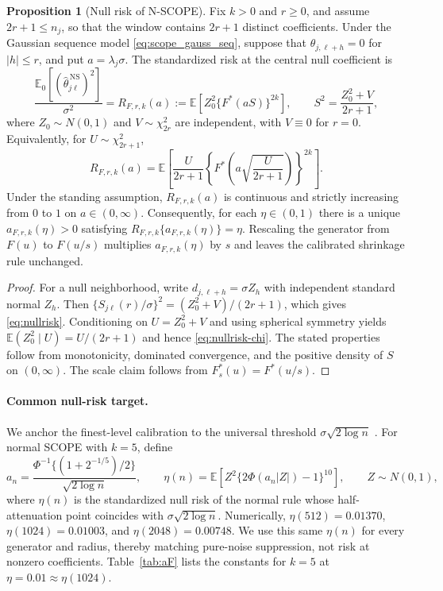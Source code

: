 \documentclass[12pt]{article}
\theoremstyle{definition}
\newtheorem{proposition}{Proposition}
\theoremstyle{definition}
\newcommand{\E}{\mathbb{E}}
\begin{document}
\begin{proposition}[Null risk of N-SCOPE]
\label{prop:nullrisk}
Fix $k>0$ and $r\geq0$, and assume $2r+1\le n_j$, so that the window
contains $2r+1$ distinct coefficients. Under the Gaussian sequence model
\eqref{eq:scope_gauss_seq}, suppose that $\theta_{j,\ell+h}=0$ for
$|h|\leq r$, and put $a=\lambda_j\sigma$. The standardized risk at the
central null coefficient is
\begin{equation}
\frac{\E_0[(\widehat\theta_{j\ell}^{\,\mathrm{NS}})^2]}{\sigma^2}
 = R_{F,r,k}(a)
 :=\E\!\left[Z_0^2\{F^*(aS)\}^{2k}\right],
 \qquad S^2=\frac{Z_0^2+V}{2r+1},
\label{eq:nullrisk}
\end{equation}
where $Z_0\sim N(0,1)$ and $V\sim\chi^2_{2r}$ are independent, with
$V\equiv0$ for $r=0$. Equivalently, for $U\sim\chi^2_{2r+1}$,
\begin{equation}
R_{F,r,k}(a)
 = \E\!\left[\frac{U}{2r+1}
 \left\{F^*\!\left(a\sqrt{\frac{U}{2r+1}}\right)\right\}^{2k}\right].
\label{eq:nullrisk-chi}
\end{equation}
Under the standing assumption, $R_{F,r,k}(a)$ is continuous and
strictly increasing from $0$ to $1$ on $a\in(0,\infty)$. Consequently,
for each $\eta\in(0,1)$ there is a unique $a_{F,r,k}(\eta)>0$
satisfying $R_{F,r,k}\{a_{F,r,k}(\eta)\}=\eta$. Rescaling the generator
from $F(u)$ to $F(u/s)$ multiplies $a_{F,r,k}(\eta)$ by $s$ and leaves
the calibrated shrinkage rule unchanged.
\end{proposition}

\begin{proof}
For a null neighborhood, write $d_{j,\ell+h}=\sigma Z_h$ with
independent standard normal $Z_h$. Then
$\{S_{j\ell}(r)/\sigma\}^2=(Z_0^2+V)/(2r+1)$, which gives
\eqref{eq:nullrisk}. Conditioning on $U=Z_0^2+V$ and using spherical
symmetry yields $\E(Z_0^2\mid U)=U/(2r+1)$ and hence
\eqref{eq:nullrisk-chi}. The stated properties follow from
monotonicity, dominated convergence, and the positive density of $S$ on
$(0,\infty)$. The scale claim follows from $F_s^*(u)=F^*(u/s)$.
\end{proof}

\paragraph{Common null-risk target.}
We anchor the finest-level calibration to the universal threshold
$\sigma\sqrt{2\log n}$ \citep{DonohoJohnstone1994}. For normal
SCOPE with $k=5$, define
\begin{equation}
a_n=\frac{\Phi^{-1}\{(1+2^{-1/5})/2\}}{\sqrt{2\log n}},
\qquad
\eta(n)=\E\left[Z^2\{2\Phi(a_n|Z|)-1\}^{10}\right],
\qquad Z\sim N(0,1),
\label{eq:eta-n}
\end{equation}
where $\eta(n)$ is the standardized null risk of the normal rule
whose half-attenuation point coincides with
$\sigma\sqrt{2\log n}$. Numerically,
$\eta(512)=0.01370$, $\eta(1024)=0.01003$, and
$\eta(2048)=0.00748$. We use this same $\eta(n)$ for every
generator and radius, thereby matching pure-noise suppression, not
risk at nonzero coefficients. Table~\ref{tab:aF} lists the constants
for $k=5$ at $\eta=0.01\approx\eta(1024)$.
\end{document}

